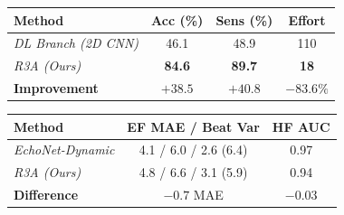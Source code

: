 \documentclass{article}
\begin{document}
\begin{figure}[h]
\centering
\begin{minipage}[t]{0.48\linewidth}
\centering
\scriptsize
\setlength{\tabcolsep}{4pt}
\renewcommand{\arraystretch}{1.15}
\label{tab:soz_results}
\begin{tabular}{lccc}
\toprule
\textbf{Method} & \textbf{Acc (\%)} & \textbf{Sens (\%)} & \textbf{Effort} \\
\midrule
\textit{DL Branch (2D CNN)} & 46.1 & 48.9 & 110 \\
\textit{R3A (Ours)} & \textbf{84.6} & \textbf{89.7} & \textbf{18} \\
\midrule
\rowcolor[gray]{0.95}
\textbf{Improvement} & $\mathbf{+38.5}$ & $\mathbf{+40.8}$ & $\mathbf{-83.6\%}$ \\
\bottomrule
\end{tabular}
\end{minipage}%
\hfill
\begin{minipage}[t]{0.48\linewidth}
\centering
\scriptsize
\setlength{\tabcolsep}{4pt}
\renewcommand{\arraystretch}{1.15}
\label{tab:cardiac_results}
\begin{tabular}{lcc}
\toprule
\textbf{Method} & \textbf{EF MAE / Beat Var} & \textbf{HF AUC} \\
\midrule
\textit{EchoNet-Dynamic} & 4.1 / 6.0 / 2.6 (6.4) & 0.97 \\
\textit{R3A (Ours)}      & 4.8 / 6.6 / 3.1 (5.9) & 0.94 \\
\midrule
\rowcolor[gray]{0.95}
\textbf{Difference} & $-0.7$ MAE & $-0.03$ \\
\bottomrule
\end{tabular}
\end{minipage}
\end{figure}
\end{document}
